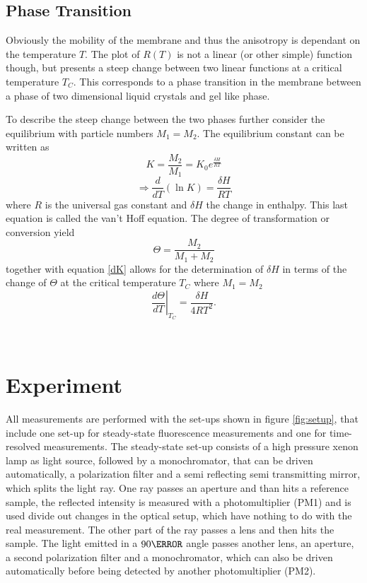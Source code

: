 \documentclass{scrartcl}
\numberwithin{equation}{section}
\numberwithin{figure}{section}
\numberwithin{table}{section}
\newcommand{\eq}[2]{\begin{equation}#1\label{#2}\end{equation}}
\begin{document}
\subsection{Phase Transition}
Obviously the mobility of the membrane and thus the anisotropy is dependant on the temperature $T$. The plot of $R(T)$ is not a linear (or other simple) function though, but presents a steep change between two linear functions at a critical temperature $T_C$. This corresponds to a phase transition in the membrane between a phase of two dimensional liquid crystals and gel like phase.

To describe the steep change between the two phases further consider the equilibrium with particle numbers $M_1=M_2$. The equilibrium constant can be written as
\eq{K = \frac{M_2}{M_1} = K_0 e^{\frac{\delta H}{R T}}}{K}
\eq{\Rightarrow \frac{d}{dT}(\ln K) = \frac{\delta H}{R T}}{dK}
where $R$ is the universal gas constant and $\delta H$ the change in enthalpy. This last equation is called the van't Hoff equation. The degree of transformation or conversion yield 
\eq{\Theta = \frac{M_2}{M_1+M_2}}{Theta}
together with equation \ref{dK} allows for the determination of $\delta H$ in terms of the change of $\Theta$ at the critical temperature $T_C$ where $M_1=M_2$
\eq{{\left.\frac{d\Theta}{dT}\right |}_{T_C} = \frac{\delta H}{4 R T^2} .}{dTheta}

\clearpage
~
\clearpage

\section{Experiment}
All measurements are performed with the set-ups shown in figure \ref{fig:setup}, that include one set-up for steady-state fluorescence measurements and one for time-resolved measurements. The steady-state set-up consists of a high pressure xenon lamp as light source, followed by a monochromator, that can be driven automatically, a polarization filter and a semi reflecting semi transmitting mirror, which splits the light ray. One ray passes an aperture and than hits a reference sample, the reflected intensity is measured with a photomultiplier (PM1) and is used divide out changes in the optical setup, which have nothing to do with the real measurement. The other part of the ray passes a lens and then hits the sample. The light emitted in a $90 \degree$ angle passes another lens, an aperture, a second polarization filter and a monochromator, which can also be driven automatically before being detected by another photomultiplier (PM2).
\end{document}
